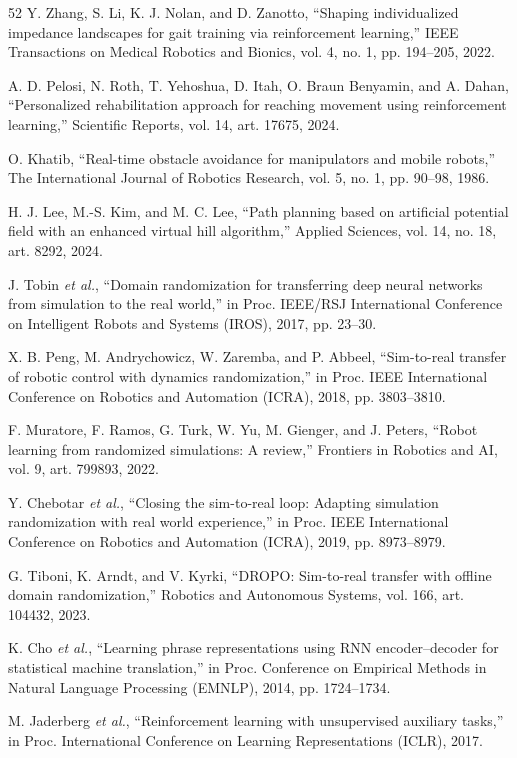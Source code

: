\documentclass[journal,twoside,web]{ieeecolor2}
\begin{document}
\begin{thebibliography}{52}
 Y. Zhang, S. Li, K. J. Nolan, and D. Zanotto, ``Shaping individualized impedance landscapes for gait training via reinforcement learning,'' IEEE Transactions on Medical Robotics and Bionics, vol. 4, no. 1, pp. 194--205, 2022.

 A. D. Pelosi, N. Roth, T. Yehoshua, D. Itah, O. Braun Benyamin, and A. Dahan, ``Personalized rehabilitation approach for reaching movement using reinforcement learning,'' Scientific Reports, vol. 14, art. 17675, 2024.

 O. Khatib, ``Real-time obstacle avoidance for manipulators and mobile robots,'' The International Journal of Robotics Research, vol. 5, no. 1, pp. 90--98, 1986.

 H. J. Lee, M.-S. Kim, and M. C. Lee, ``Path planning based on artificial potential field with an enhanced virtual hill algorithm,'' Applied Sciences, vol. 14, no. 18, art. 8292, 2024.

 J. Tobin \emph{et al.}, ``Domain randomization for transferring deep neural networks from simulation to the real world,'' in Proc. IEEE/RSJ International Conference on Intelligent Robots and Systems (IROS), 2017, pp. 23--30.

 X. B. Peng, M. Andrychowicz, W. Zaremba, and P. Abbeel, ``Sim-to-real transfer of robotic control with dynamics randomization,'' in Proc. IEEE International Conference on Robotics and Automation (ICRA), 2018, pp. 3803--3810.

 F. Muratore, F. Ramos, G. Turk, W. Yu, M. Gienger, and J. Peters, ``Robot learning from randomized simulations: A review,'' Frontiers in Robotics and AI, vol. 9, art. 799893, 2022.

 Y. Chebotar \emph{et al.}, ``Closing the sim-to-real loop: Adapting simulation randomization with real world experience,'' in Proc. IEEE International Conference on Robotics and Automation (ICRA), 2019, pp. 8973--8979.

 G. Tiboni, K. Arndt, and V. Kyrki, ``DROPO: Sim-to-real transfer with offline domain randomization,'' Robotics and Autonomous Systems, vol. 166, art. 104432, 2023.

 K. Cho \emph{et al.}, ``Learning phrase representations using RNN encoder--decoder for statistical machine translation,'' in Proc. Conference on Empirical Methods in Natural Language Processing (EMNLP), 2014, pp. 1724--1734.

 M. Jaderberg \emph{et al.}, ``Reinforcement learning with unsupervised auxiliary tasks,'' in Proc. International Conference on Learning Representations (ICLR), 2017.


\end{thebibliography}
\end{document}
